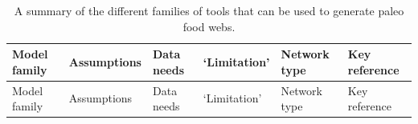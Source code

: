 \documentclass[
]{article}
\begin{document}
\begin{longtable}[]{@{}
  >{\raggedright\arraybackslash}p{}
  >{\raggedright\arraybackslash}p{}
  >{\raggedright\arraybackslash}p{}
  >{\raggedright\arraybackslash}p{}
  >{\raggedright\arraybackslash}p{}
  >{\raggedright\arraybackslash}p{}@{}}
\caption{A summary of the different families of tools that can be used
to generate paleo food webs.}\label{tbl-models}\tabularnewline
\toprule\noalign{}
\begin{minipage}[b]{\linewidth}\raggedright
Model family
\end{minipage} & \begin{minipage}[b]{\linewidth}\raggedright
Assumptions
\end{minipage} & \begin{minipage}[b]{\linewidth}\raggedright
Data needs
\end{minipage} & \begin{minipage}[b]{\linewidth}\raggedright
`Limitation'
\end{minipage} & \begin{minipage}[b]{\linewidth}\raggedright
Network type
\end{minipage} & \begin{minipage}[b]{\linewidth}\raggedright
Key reference
\end{minipage} \\
\midrule\noalign{}
\endfirsthead
\toprule\noalign{}
\begin{minipage}[b]{\linewidth}\raggedright
Model family
\end{minipage} & \begin{minipage}[b]{\linewidth}\raggedright
Assumptions
\end{minipage} & \begin{minipage}[b]{\linewidth}\raggedright
Data needs
\end{minipage} & \begin{minipage}[b]{\linewidth}\raggedright
`Limitation'
\end{minipage} & \begin{minipage}[b]{\linewidth}\raggedright
Network type
\end{minipage} & \begin{minipage}[b]{\linewidth}\raggedright
Key reference
\end{minipage} \\

\end{longtable}
\end{document}

